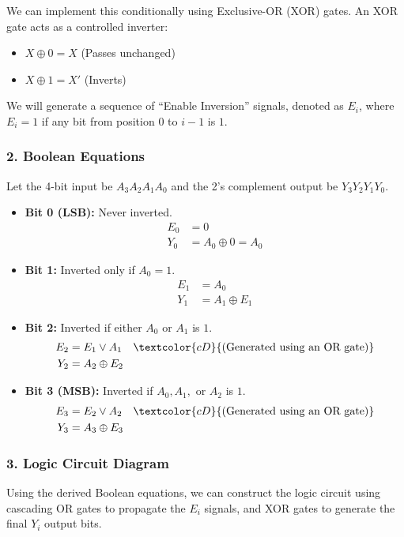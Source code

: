 \documentclass[12pt,a3paper]{article}
\begin{document}
\begin{enumerate}
\begin{tcolorbox}[enhanced,breakable,ansbox,colback=cD!4,colframe=cD,boxrule=0.8pt,arc=5pt,title={\textbf{Answer}},fonttitle=\bfseries\color{white},colbacktitle=cD]
We can implement this conditionally using Exclusive-OR (XOR) gates. An XOR gate acts as a controlled inverter: 
\begin{itemize}
    \item $X \oplus 0 = X$ (Passes unchanged)
    \item $X \oplus 1 = X'$ (Inverts)
\end{itemize}
We will generate a sequence of ``Enable Inversion'' signals, denoted as $E_i$, where $E_i = 1$ if any bit from position $0$ to $i-1$ is $1$. 

\subsubsection*{2. Boolean Equations}
Let the 4-bit input be $A_3 A_2 A_1 A_0$ and the 2's complement output be $Y_3 Y_2 Y_1 Y_0$.

\begin{itemize}
    \item \textbf{Bit 0 (LSB):} Never inverted.
    \begin{align*}
        E_0 &= 0 \\
        Y_0 &= A_0 \oplus 0 = A_0
    \end{align*}
    
    \item \textbf{Bit 1:} Inverted only if $A_0 = 1$.
    \begin{align*}
        E_1 &= A_0 \\
        Y_1 &= A_1 \oplus E_1
    \end{align*}
    
    \item \textbf{Bit 2:} Inverted if either $A_0$ or $A_1$ is $1$.
    \begin{align*}
        E_2 &= E_1 \lor A_1 \quad \textcolor{cD}{\text{(Generated using an OR gate)}} \\
        Y_2 &= A_2 \oplus E_2
    \end{align*}
    
    \item \textbf{Bit 3 (MSB):} Inverted if $A_0, A_1,$ or $A_2$ is $1$.
    \begin{align*}
        E_3 &= E_2 \lor A_2 \quad \textcolor{cD}{\text{(Generated using an OR gate)}} \\
        Y_3 &= A_3 \oplus E_3
    \end{align*}
\end{itemize}

\subsubsection*{3. Logic Circuit Diagram}
Using the derived Boolean equations, we can construct the logic circuit using cascading OR gates to propagate the $E_i$ signals, and XOR gates to generate the final $Y_i$ output bits.


\end{tcolorbox}
\end{enumerate}
\end{document}
